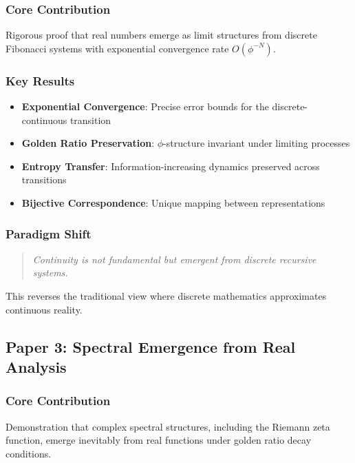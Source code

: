 \documentclass[12pt]{article}
\theoremstyle{plain}
\theoremstyle{definition}
\begin{document}
\subsubsection{Core Contribution}
Rigorous proof that real numbers emerge as limit structures from discrete Fibonacci systems with exponential convergence rate $O(\phi^{-N})$.

\subsubsection{Key Results}
\begin{itemize}
\item \textbf{Exponential Convergence}: Precise error bounds for the discrete-continuous transition
\item \textbf{Golden Ratio Preservation}: $\phi$-structure invariant under limiting processes  
\item \textbf{Entropy Transfer}: Information-increasing dynamics preserved across transitions
\item \textbf{Bijective Correspondence}: Unique mapping between representations
\end{itemize}

\subsubsection{Paradigm Shift}
\begin{quote}
\emph{Continuity is not fundamental but emergent from discrete recursive systems.}
\end{quote}

This reverses the traditional view where discrete mathematics approximates continuous reality.

\subsection{Paper 3: Spectral Emergence from Real Analysis}

\subsubsection{Core Contribution}
Demonstration that complex spectral structures, including the Riemann zeta function, emerge inevitably from real functions under golden ratio decay conditions.
\end{document}
